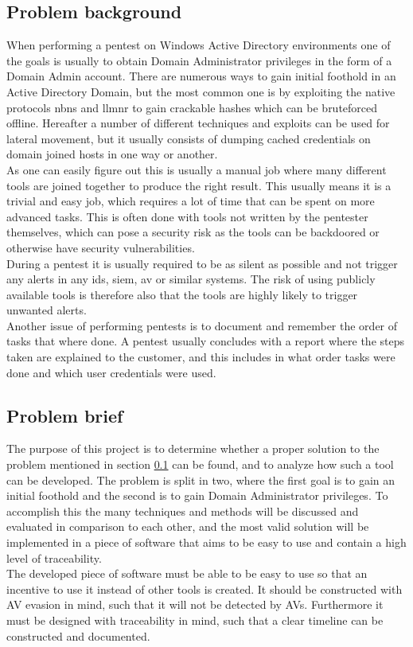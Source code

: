 \documentclass{article}
\begin{document}
\subsection{Problem background}
\label{sec:problem-background}
When performing a pentest on Windows Active Directory environments one of the goals is usually to obtain Domain Administrator privileges in the form of a Domain Admin account. There are numerous ways to gain initial foothold in an Active Directory Domain, but the most common one is by exploiting the native protocols \gls{nbns} and \gls{llmnr}\cite{url:zero-to-domain-admin} to gain crackable hashes which can be bruteforced offline.
Hereafter a number of different techniques and exploits can be used for lateral movement, but it usually consists of dumping cached credentials on domain joined hosts in one way or another.
\\
As one can easily figure out this is usually a manual job where many different tools are joined together to produce the right result. This usually means it is a trivial and easy job, which requires a lot of time that can be spent on more advanced tasks. This is often done with tools not written by the pentester themselves, which can pose a security risk as the tools can be backdoored or otherwise have security vulnerabilities.
\\
During a pentest it is usually required to be as silent as possible and not trigger any alerts in any \gls{ids}, \gls{siem}, \gls{av} or similar systems. The risk of using publicly available tools is therefore also that the tools are highly likely to trigger unwanted alerts.
\\
Another issue of performing pentests is to document and remember the order of tasks that where done. A pentest usually concludes with a report where the steps taken are explained to the customer, and this includes in what order tasks were done and which user credentials were used.

\subsection{Problem brief}
The purpose of this project is to determine whether a proper solution to the problem mentioned in section \ref{sec:problem-background} can be found, and to analyze how such a tool can be developed. The problem is split in two, where the first goal is to gain an initial foothold and the second is to gain Domain Administrator privileges. To accomplish this the many techniques and methods will be discussed and evaluated in comparison to each other, and the most valid solution will be implemented in a piece of software that aims to be easy to use and contain a high level of traceability.
\\
The developed piece of software must be able to be easy to use so that an incentive to use it instead of other tools is created. It should be constructed with AV evasion in mind, such that it will not be detected by AVs. Furthermore it must be designed with traceability in mind, such that a clear timeline can be constructed and documented.
\end{document}
